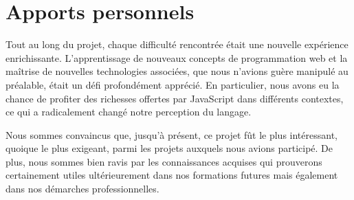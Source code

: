 \documentclass[a4paper,12pt]{report}
\theoremstyle{break}
\theoremstyle{break}
\theoremstyle{break}
\theoremstyle{break}
\theoremstyle{definition}
\theoremstyle{remark}
\begin{document}
\section{Apports personnels}
Tout au long du projet, chaque difficulté rencontrée était une nouvelle expérience enrichissante. L'apprentissage de nouveaux concepts de programmation web et la maîtrise de nouvelles technologies associées, que nous n'avions guère manipulé au préalable, était un défi profondément apprécié. En particulier, nous avons eu la chance de profiter des richesses offertes par JavaScript dans différents contextes, ce qui a radicalement changé notre perception du langage.

Nous sommes convaincus que, jusqu'à présent, ce projet fût le plus intéressant, quoique le plus exigeant, parmi les projets auxquels nous avions participé. De plus, nous sommes bien ravis par les connaissances acquises qui prouverons certainement utiles ultérieurement dans nos formations futures mais également dans nos démarches professionnelles.
\begin{appendices}
\setcounter{page}{1}
\end{appendices}
\end{document}
